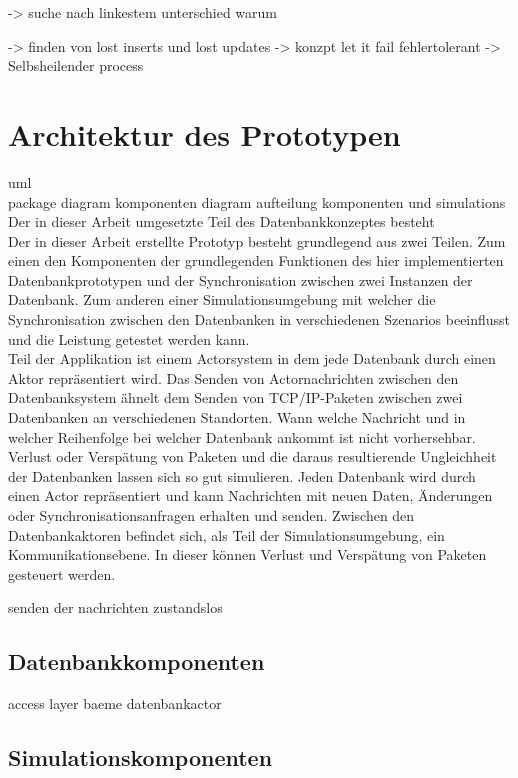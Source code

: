 \documentclass[a4paper,11pt,oneside,%
headsepline,												%
footsepline,												%
bibtotocnumbered									%
]{scrreprt}
\begin{document}
-> suche nach linkestem unterschied warum 

-> finden von lost inserts und lost updates		
-> konzpt let it fail fehlertolerant 
-> Selbsheilender process
	
\section{Architektur des Prototypen}
uml\\ package diagram komponenten diagram
aufteilung komponenten und simulations\\

Der in dieser Arbeit umgesetzte Teil des Datenbankkonzeptes besteht\\
Der in dieser Arbeit erstellte Prototyp besteht grundlegend aus zwei Teilen. Zum einen den Komponenten der grundlegenden Funktionen des hier implementierten Datenbankprototypen und der Synchronisation zwischen zwei Instanzen der Datenbank. Zum anderen einer Simulationsumgebung mit welcher die Synchronisation zwischen den Datenbanken in verschiedenen Szenarios beeinflusst und die Leistung getestet werden kann. \\

Teil der Applikation ist einem Actorsystem in dem jede Datenbank durch einen Aktor repräsentiert wird.
Das Senden von Actornachrichten zwischen den Datenbanksystem ähnelt dem Senden von TCP/IP-Paketen zwischen zwei Datenbanken an verschiedenen Standorten. Wann welche Nachricht und in welcher Reihenfolge bei welcher Datenbank ankommt ist nicht vorhersehbar. Verlust oder Verspätung von Paketen und die daraus resultierende Ungleichheit der Datenbanken lassen sich so gut simulieren.
Jeden Datenbank wird durch einen Actor repräsentiert und kann Nachrichten mit neuen Daten, Änderungen oder Synchronisationsanfragen erhalten und senden. Zwischen den Datenbankaktoren befindet sich, als Teil der Simulationsumgebung, ein Kommunikationsebene. In dieser können  Verlust und Verspätung von Paketen gesteuert werden.


senden der nachrichten zustandslos

\subsection{Datenbankkomponenten}
access layer
baeme
datenbankactor

\subsection{Simulationskomponenten}	
\end{document}
